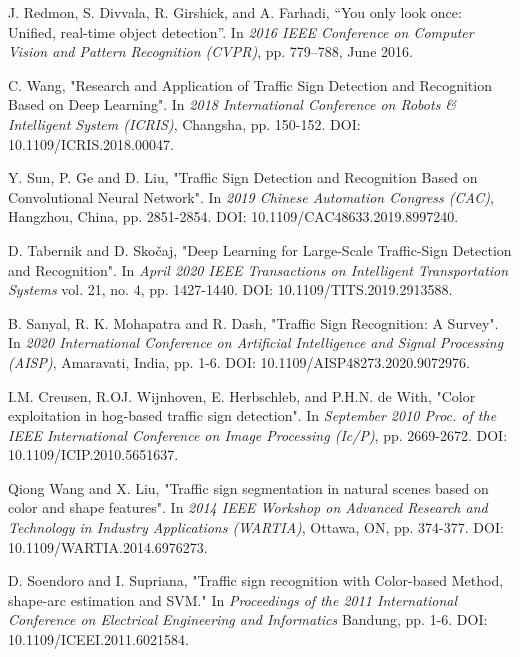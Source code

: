 \documentclass[10pt,twocolumn,letterpaper]{article}
\begin{document}
\begin{thebibliography}{9}
	
		J. Redmon, S. Divvala, R. Girshick, and A. Farhadi, “You only look
		once: Unified, real-time object detection”. In \textit{2016 IEEE Conference on Computer Vision and Pattern Recognition (CVPR)}, pp. 779–788, June
		2016.
	
		C. Wang, "Research and Application of Traffic Sign Detection and Recognition Based on Deep Learning". In \textit{2018 International Conference on Robots \& Intelligent System (ICRIS)}, Changsha, pp. 150-152. DOI: 10.1109/ICRIS.2018.00047.
	
		Y. Sun, P. Ge and D. Liu, "Traffic Sign Detection and Recognition Based on Convolutional Neural Network". In \textit{2019 Chinese Automation Congress (CAC)}, Hangzhou, China, pp. 2851-2854. DOI: 10.1109/CAC48633.2019.8997240.
		
		D. Tabernik and D. Skočaj, "Deep Learning for Large-Scale Traffic-Sign Detection and Recognition". In \textit{April 2020 IEEE Transactions on Intelligent Transportation Systems} vol. 21, no. 4, pp. 1427-1440. DOI: 10.1109/TITS.2019.2913588.
	
		B. Sanyal, R. K. Mohapatra and R. Dash, "Traffic Sign Recognition: A Survey". In \textit{2020 International Conference on Artificial Intelligence and Signal Processing (AISP)}, Amaravati, India, pp. 1-6. DOI: 10.1109/AISP48273.2020.9072976.
		
		 I.M. Creusen, R.OJ. Wijnhoven, E. Herbschleb, and P.H.N. de With, "Color exploitation in hog-based traffic sign detection". In  \textit{September 2010 Proc. of the IEEE International Conference on Image Processing (Ic/P)}, pp. 2669-2672. DOI: 10.1109/ICIP.2010.5651637.
		 
		Qiong Wang and X. Liu, "Traffic sign segmentation in natural scenes based on color and shape features". In \textit{2014 IEEE Workshop on Advanced Research and Technology in Industry Applications (WARTIA)}, Ottawa, ON, pp. 374-377. DOI: 10.1109/WARTIA.2014.6976273.
		
		D. Soendoro and I. Supriana, "Traffic sign recognition with Color-based Method, shape-arc estimation and SVM." In \textit{Proceedings of the 2011 International Conference on Electrical Engineering and Informatics} Bandung, pp. 1-6. DOI: 10.1109/ICEEI.2011.6021584.
		

\end{thebibliography}
\end{document}
